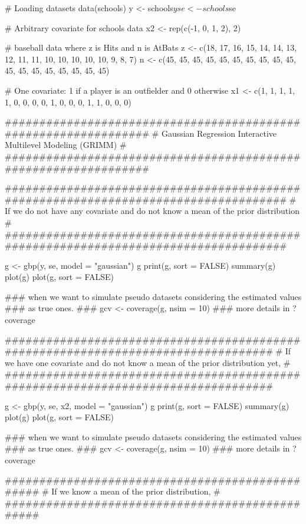 \documentclass[a4paper]{book}
\begin{document}
\begin{Examples}
\begin{ExampleCode}

  # Loading datasets
  data(schools)
  y <- schools$y
  se <- schools$se

  # Arbitrary covariate for schools data
  x2 <- rep(c(-1, 0, 1, 2), 2)
  
  # baseball data where z is Hits and n is AtBats
  z <- c(18, 17, 16, 15, 14, 14, 13, 12, 11, 11, 10, 10, 10, 10, 10,  9,  8,  7)
  n <- c(45, 45, 45, 45, 45, 45, 45, 45, 45, 45, 45, 45, 45, 45, 45, 45, 45, 45)

  # One covariate: 1 if a player is an outfielder and 0 otherwise
  x1 <- c(1,  1,  1,  1,  1,  0,  0,  0,  0,  1,  0,  0,  0,  1,  1,  0,  0,  0)

  ################################################################
  # Gaussian Regression Interactive Multilevel Modeling (GRIMM) #
  ################################################################

    ####################################################################################
    # If we do not have any covariate and do not know a mean of the prior distribution #
    ####################################################################################

    g <- gbp(y, se, model = "gaussian")
    g
    print(g, sort = FALSE)
    summary(g)
    plot(g)
    plot(g, sort = FALSE)

    ### when we want to simulate pseudo datasets considering the estimated values 
    ### as true ones.
    ### gcv <- coverage(g, nsim = 10)  
    ### more details in ?coverage

    ##################################################################################
    # If we have one covariate and do not know a mean of the prior distribution yet, #
    ##################################################################################

    g <- gbp(y, se, x2, model = "gaussian")
    g
    print(g, sort = FALSE)
    summary(g)
    plot(g)
    plot(g, sort = FALSE)

    ### when we want to simulate pseudo datasets considering the estimated values 
    ### as true ones.
    ### gcv <- coverage(g, nsim = 10)  
    ### more details in ?coverage 

    ################################################
    # If we know a mean of the prior distribution, #
    ################################################


\end{ExampleCode}
\end{Examples}
\end{document}
